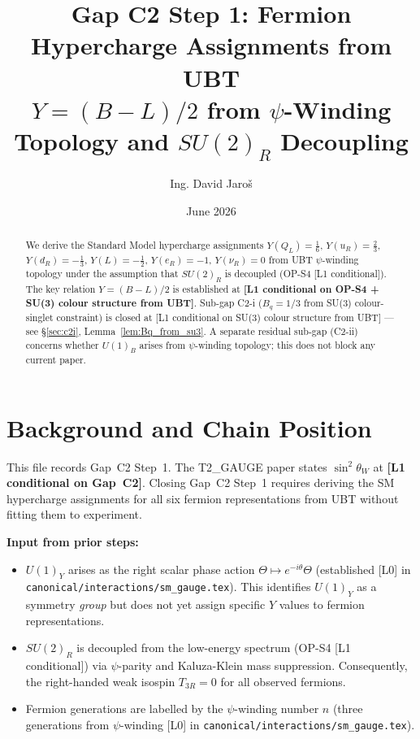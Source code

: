 \documentclass[12pt,a4paper]{article}
\title{\textbf{Gap C2 Step 1: Fermion Hypercharge Assignments from UBT}\\
       \large $Y = (B{-}L)/2$ from $\psi$-Winding Topology and $SU(2)_R$ Decoupling}
\author{Ing. David Jaroš}
\date{June 2026}
\theoremstyle{definition}
\theoremstyle{remark}
\begin{document}
\maketitle

\begin{abstract}
We derive the Standard Model hypercharge assignments
$Y(Q_L)=\tfrac{1}{6}$, $Y(u_R)=\tfrac{2}{3}$, $Y(d_R)=-\tfrac{1}{3}$,
$Y(L)=-\tfrac{1}{2}$, $Y(e_R)=-1$, $Y(\nu_R)=0$
from UBT $\psi$-winding topology under the assumption that $SU(2)_R$ is
decoupled (OP-S4 [L1 conditional]).
The key relation $Y = (B{-}L)/2$ is established at
\textbf{[L1 conditional on OP-S4 + SU(3) colour structure from UBT]}.
Sub-gap C2-i ($B_q=1/3$ from SU(3) colour-singlet constraint) is closed at
[L1 conditional on SU(3) colour structure from UBT] — see \S\ref{sec:c2i},
Lemma~\ref{lem:Bq_from_su3}.
A separate residual sub-gap (C2-ii) concerns whether $U(1)_B$ arises
from $\psi$-winding topology; this does not block any current paper.
\end{abstract}

\fi

\section{Background and Chain Position}
\label{sec:background}

This file records Gap~C2 Step~1.
The T2\_GAUGE paper states $\sin^2\theta_W$ at
\textbf{[L1 conditional on Gap~C2]}.
Closing Gap~C2 Step~1 requires deriving the SM hypercharge assignments
for all six fermion representations from UBT without fitting them to experiment.

\textbf{Input from prior steps:}
\begin{itemize}
  \item $U(1)_Y$ arises as the right scalar phase action
        $\Theta \mapsto e^{-i\theta}\Theta$
        (established [L0] in \texttt{canonical/interactions/sm\_gauge.tex}).
        This identifies $U(1)_Y$ as a symmetry \emph{group} but does not
        yet assign specific $Y$ values to fermion representations.
  \item $SU(2)_R$ is decoupled from the low-energy spectrum (OP-S4 [L1 conditional])
        via $\psi$-parity and Kaluza-Klein mass suppression.
        Consequently, the right-handed weak isospin $T_{3R}=0$ for all
        observed fermions.
  \item Fermion generations are labelled by the $\psi$-winding number $n$
        (three generations from $\psi$-winding [L0] in
        \texttt{canonical/interactions/sm\_gauge.tex}).
\end{itemize}
\end{document}
